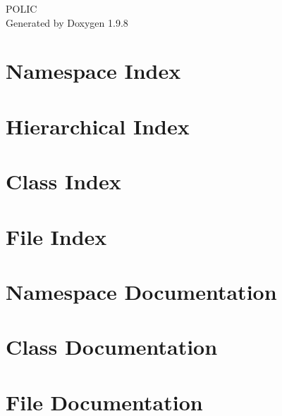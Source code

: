 \documentclass[twoside]{book}
\newcommand{\+}{\discretionary{\mbox{\scriptsize$\hookleftarrow$}}{}{}}
\newcommand{\clearemptydoublepage}{%
    \newpage{\pagestyle{empty}\cleardoublepage}%
  }
\begin{document}
  \raggedbottom
    \hypersetup{pageanchor=false,
                bookmarksnumbered=true,
                pdfencoding=unicode
               }
  \begin{titlepage}
  \vspace*{7cm}
  \begin{center}%
  {\Large POLIC}\\
  \vspace*{1cm}
  {\large Generated by Doxygen 1.9.8}\\
  \end{center}
  \end{titlepage}
  \clearemptydoublepage
  \tableofcontents
  \clearemptydoublepage
  \hypersetup{pageanchor=true}

\chapter{Namespace Index}

\chapter{Hierarchical Index}

\chapter{Class Index}

\chapter{File Index}

\chapter{Namespace Documentation}




\chapter{Class Documentation}







\chapter{File Documentation}





  \backmatter
  \newpage
  \clearemptydoublepage
  \printindex
\end{document}
